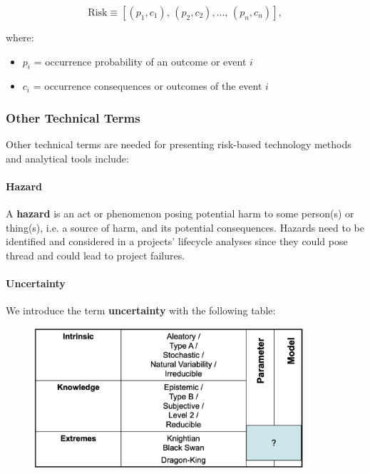 \documentclass[a4paper]{extarticle}
\begin{document}
\[
    \text{Risk} \equiv [(p_1,c_1), \, (p_2,c_2),..., \, (p_n,c_n)],
\]

where:

\begin{itemize}
    \item \(p_i\) = occurrence probability of an outcome or event \(i\)
    \item \(c_i\) = occurrence consequences or outcomes of the event \(i\)
\end{itemize}

\subsubsection{Other Technical Terms}

Other technical terms are needed for presenting risk-based technology methods and analytical tools include:

\paragraph{Hazard} A \textbf{hazard} is an act or phenomenon posing potential harm to some person(s) or thing(s), i.e. a source of harm, and its potential consequences. Hazards need to be identified and considered in a projects' lifecycle analyses since they could pose thread and could lead to project failures.

\paragraph{Uncertainty} We introduce the term \textbf{uncertainty} with the following table:

\begin{figure}[H]
    \includegraphics[width=10cm]{../images/EnpRisk_Fig1-1}
    \centering
\end{figure}
\end{document}
